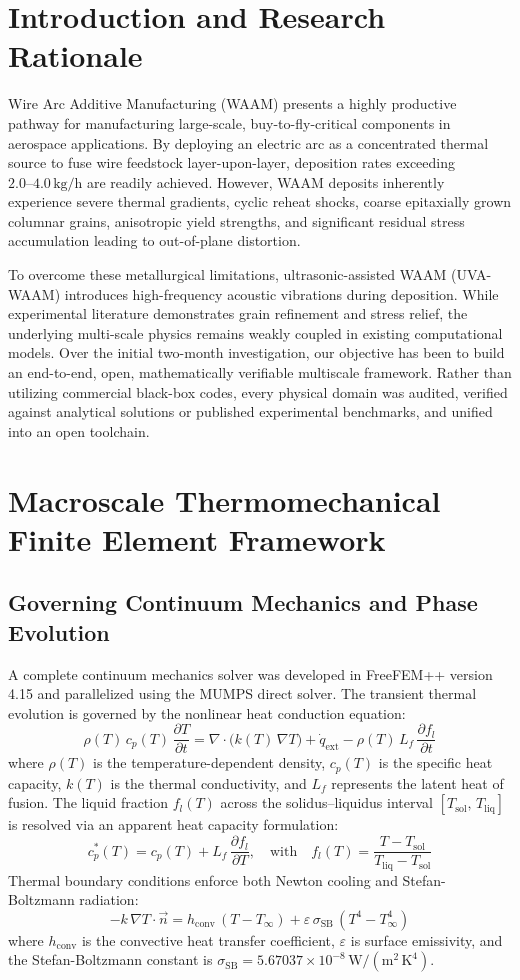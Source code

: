 \documentclass[10pt,a4paper]{article}
\begin{document}
\section{Introduction and Research Rationale}
Wire Arc Additive Manufacturing (WAAM) presents a highly productive pathway for manufacturing large-scale, buy-to-fly-critical components in aerospace applications. By deploying an electric arc as a concentrated thermal source to fuse wire feedstock layer-upon-layer, deposition rates exceeding \(2.0\text{--}4.0\,\mathrm{kg/h}\) are readily achieved. However, WAAM deposits inherently experience severe thermal gradients, cyclic reheat shocks, coarse epitaxially grown columnar grains, anisotropic yield strengths, and significant residual stress accumulation leading to out-of-plane distortion.

To overcome these metallurgical limitations, ultrasonic-assisted WAAM (UVA-WAAM) introduces high-frequency acoustic vibrations during deposition. While experimental literature demonstrates grain refinement and stress relief, the underlying multi-scale physics remains weakly coupled in existing computational models. Over the initial two-month investigation, our objective has been to build an end-to-end, open, mathematically verifiable multiscale framework. Rather than utilizing commercial black-box codes, every physical domain was audited, verified against analytical solutions or published experimental benchmarks, and unified into an open toolchain.

\section{Macroscale Thermomechanical Finite Element Framework}

\subsection{Governing Continuum Mechanics and Phase Evolution}
A complete continuum mechanics solver was developed in FreeFEM++ version 4.15 and parallelized using the MUMPS direct solver. The transient thermal evolution is governed by the nonlinear heat conduction equation:
\[
\rho(T)\,c_p(T)\,\frac{\partial T}{\partial t} = \nabla \cdot \bigl(k(T)\,\nabla T\bigr) + \dot{q}_{\mathrm{ext}} - \rho(T)\,L_f\,\frac{\partial f_l}{\partial t}
\]
where \(\rho(T)\) is the temperature-dependent density, \(c_p(T)\) is the specific heat capacity, \(k(T)\) is the thermal conductivity, and \(L_f\) represents the latent heat of fusion. The liquid fraction \(f_l(T)\) across the solidus--liquidus interval \([T_{\mathrm{sol}},\,T_{\mathrm{liq}}]\) is resolved via an apparent heat capacity formulation:
\[
c_p^*(T) = c_p(T) + L_f\,\frac{\partial f_l}{\partial T}, \quad \text{with} \quad f_l(T) = \frac{T - T_{\mathrm{sol}}}{T_{\mathrm{liq}} - T_{\mathrm{sol}}}
\]
Thermal boundary conditions enforce both Newton cooling and Stefan-Boltzmann radiation:
\[
-k\,\nabla T \cdot \vec{n} = h_{\mathrm{conv}}\,(T - T_\infty) + \varepsilon\,\sigma_{\mathrm{SB}}\,(T^4 - T_\infty^4)
\]
where \(h_{\mathrm{conv}}\) is the convective heat transfer coefficient, \(\varepsilon\) is surface emissivity, and the Stefan-Boltzmann constant is \(\sigma_{\mathrm{SB}} = 5.67037\times 10^{-8}\,\mathrm{W/(m^2\,K^4)}\).
\end{document}
